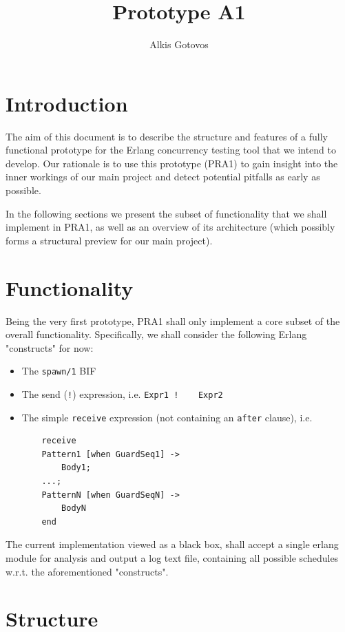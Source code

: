 \documentclass[a4paper,10pt]{article}
\title{Prototype A1}
\author{Alkis Gotovos}
\begin{document}
\lstset{language=Erlang, basicstyle=\small \ttfamily}

\begin{titlepage}
\maketitle
\thispagestyle{empty}
\end{titlepage}

\section{Introduction}
The aim of this document is to describe the structure and features
of a fully functional prototype for the Erlang concurrency testing tool that we
intend to develop. Our rationale is to use this prototype (PRA1) to gain insight
into the inner workings of our main project and detect potential pitfalls
as early as possible.

In the following sections we present the subset of functionality that we
shall implement in PRA1, as well as an overview of its architecture
(which possibly forms a structural preview for our main project).

\section{Functionality}
Being the very first prototype, PRA1 shall only implement a core subset of the
overall functionality. Specifically, we shall consider the following Erlang
"constructs" for now:
\begin{itemize}
	\item The \lstinline+spawn/1+ BIF
	\item The send (\lstinline+!+) expression, i.e. \lstinline+Expr1 !    Expr2+
	\item The simple \lstinline+receive+ expression (not containing an \lstinline+after+ clause),
	i.e.
	\begin{lstlisting}
    receive
    Pattern1 [when GuardSeq1] ->
        Body1;
    ...;
    PatternN [when GuardSeqN] ->
        BodyN
    end
	\end{lstlisting}
\end{itemize}

The current implementation viewed as a black box, shall accept a single erlang module for analysis
and output a log text file, containing all possible schedules w.r.t. the aforementioned "constructs".

\section{Structure}
\end{document}
